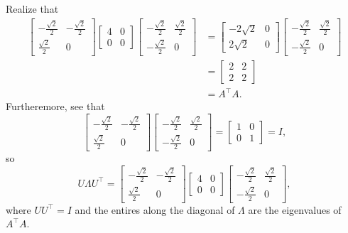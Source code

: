 \documentclass[11pt]{article}
\begin{document}
Realize that
\begin{align*}
	\begin{bmatrix} -\tfrac{\sqrt{2}}{2} & -\tfrac{\sqrt{2}}{2} \\ \tfrac{\sqrt{2}}{2} & 0 \end{bmatrix} \begin{bmatrix} 4 & 0 \\ 0 & 0 \end{bmatrix} \begin{bmatrix} -\tfrac{\sqrt{2}}{2} & \tfrac{\sqrt{2}}{2} \\ -\tfrac{\sqrt{2}}{2} & 0 \end{bmatrix} &= \begin{bmatrix} -2 \sqrt{2} & 0 \\ 2 \sqrt{2} & 0 \end{bmatrix} \begin{bmatrix} -\tfrac{\sqrt{2}}{2} & \tfrac{\sqrt{2}}{2} \\ -\tfrac{\sqrt{2}}{2} & 0 \end{bmatrix} \\
	&= \begin{bmatrix} 2 & 2 \\ 2 & 2 \end{bmatrix} \\
	&= A^{\top}A.
\end{align*}
Furtheremore, see that
\[
	\begin{bmatrix} -\tfrac{\sqrt{2}}{2} & -\tfrac{\sqrt{2}}{2} \\ \tfrac{\sqrt{2}}{2} & 0 \end{bmatrix} \begin{bmatrix} -\tfrac{\sqrt{2}}{2} & \tfrac{\sqrt{2}}{2} \\ -\tfrac{\sqrt{2}}{2} & 0 \end{bmatrix} = \begin{bmatrix} 1 & 0 \\ 0 & 1 \end{bmatrix} = I,
\]
so 
\[
	\boxed{U \Lambda U^{\top} = \begin{bmatrix} -\tfrac{\sqrt{2}}{2} & -\tfrac{\sqrt{2}}{2} \\ \tfrac{\sqrt{2}}{2} & 0 \end{bmatrix} \begin{bmatrix} 4 & 0 \\ 0 & 0 \end{bmatrix} \begin{bmatrix} -\tfrac{\sqrt{2}}{2} & \tfrac{\sqrt{2}}{2} \\ -\tfrac{\sqrt{2}}{2} & 0 \end{bmatrix}},
\]
where $UU^{\top} = I$ and the entires along the diagonal of $\Lambda$ are the eigenvalues of $A^{\top}A$.
\end{document}
